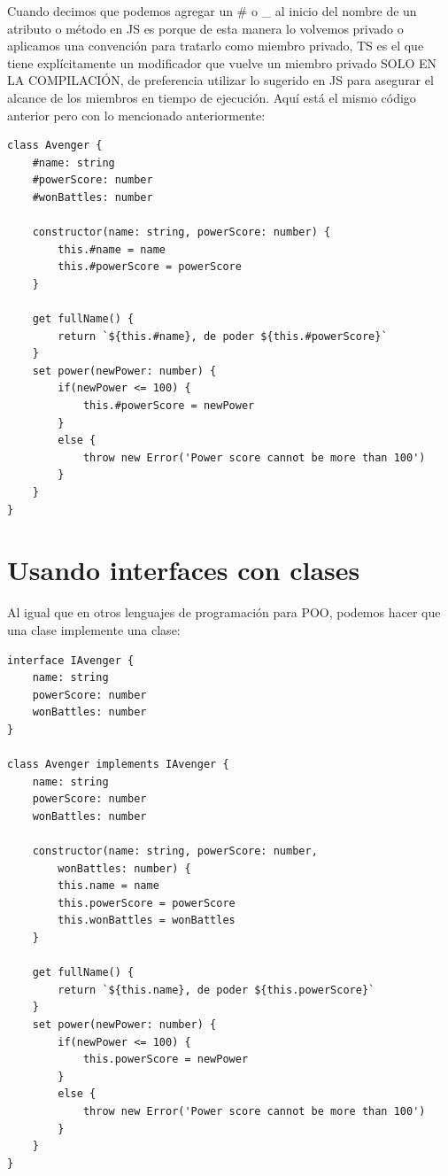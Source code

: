 Cuando decimos que podemos agregar un \# o \_ al inicio del nombre de un atributo o método en JS es porque de esta manera lo volvemos privado o aplicamos una convención para tratarlo como miembro privado, TS es el que tiene explícitamente un modificador que vuelve un miembro privado SOLO EN LA COMPILACIÓN, de preferencia utilizar lo sugerido en JS para asegurar el alcance de los miembros en tiempo de ejecución. Aquí está el mismo código anterior pero con lo mencionado anteriormente:
\begin{lstlisting}
class Avenger {
    #name: string
    #powerScore: number
    #wonBattles: number

    constructor(name: string, powerScore: number) {
        this.#name = name
        this.#powerScore = powerScore
    }

    get fullName() {
        return `${this.#name}, de poder ${this.#powerScore}`
    }
    set power(newPower: number) {
        if(newPower <= 100) {
            this.#powerScore = newPower
        }
        else {
            throw new Error('Power score cannot be more than 100')
        }
    }
}
\end{lstlisting}



\section{Usando interfaces con clases}

Al igual que en otros lenguajes de programación para POO, podemos hacer que una clase implemente una clase:
\begin{lstlisting}
interface IAvenger {
    name: string
    powerScore: number
    wonBattles: number
}

class Avenger implements IAvenger {
    name: string
    powerScore: number
    wonBattles: number
    
    constructor(name: string, powerScore: number,
        wonBattles: number) {
        this.name = name
        this.powerScore = powerScore
        this.wonBattles = wonBattles
    }

    get fullName() {
        return `${this.name}, de poder ${this.powerScore}`
    }
    set power(newPower: number) {
        if(newPower <= 100) {
            this.powerScore = newPower
        }
        else {
            throw new Error('Power score cannot be more than 100')
        }
    }
}
\end{lstlisting}



